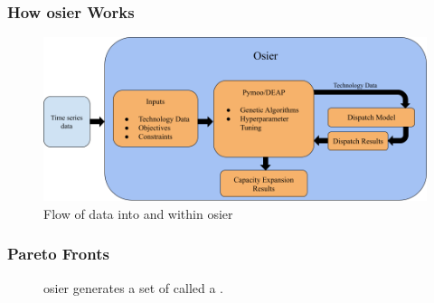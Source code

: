 \begin{frame}
    \frametitle{How \gls{osier} Works}

    \begin{figure}
        \centering
        \includegraphics[width=\columnwidth]{../docs/figures/03_osier_chapter/osier_flow.png}
        \caption{Flow of data into and within \gls{osier}}
        \label{fig:osier-flow-1}
    \end{figure}

\end{frame}

\begin{frame}
    \frametitle{Pareto Fronts}
    \begin{figure}
        \centering
        \resizebox{0.75\columnwidth}{!}{}
        \caption{\gls{osier} generates a set of  called a .}
    \end{figure}
\end{frame}

